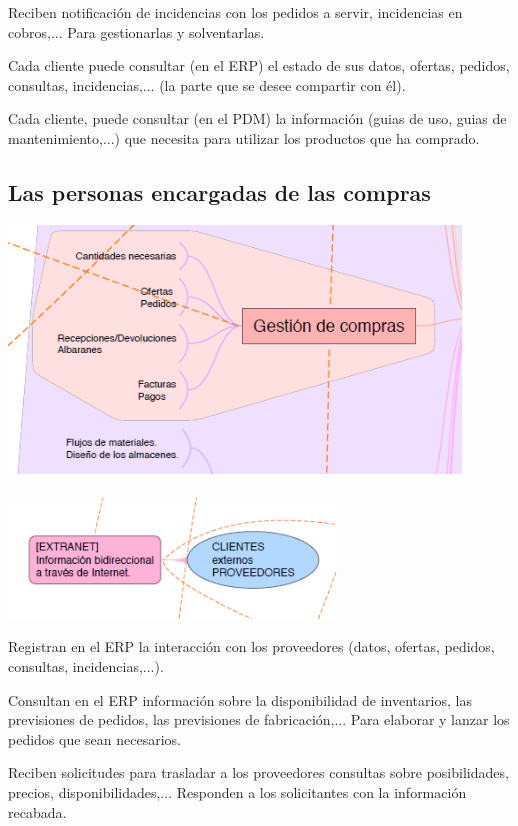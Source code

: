 \documentclass[spanish,12pt,a4paper,final,oneside]{book}
\begin{document}
Reciben notificación de incidencias con los pedidos a servir, incidencias en cobros,... Para gestionarlas y solventarlas.

Cada cliente puede consultar (en el ERP) el estado de sus datos, ofertas, pedidos, consultas, incidencias,... (la parte que se desee compartir con él).

Cada cliente, puede consultar (en el PDM) la información (guias de uso, guias de mantenimiento,...) que necesita para utilizar los productos que ha comprado.

\subsection{Las personas encargadas de las compras}
\includegraphics[width=0.9\textwidth]{subesquema - compras01}
\\\\ \includegraphics[width=0.65\textwidth]{subesquema - compras02}

Registran en el ERP la interacción con los proveedores (datos, ofertas, pedidos, consultas, incidencias,...). 

Consultan en el ERP información sobre la disponibilidad de inventarios, las previsiones de pedidos, las previsiones de fabricación,... Para elaborar y lanzar los pedidos que sean necesarios.

Reciben solicitudes para trasladar a los proveedores consultas sobre posibilidades, precios, disponibilidades,... Responden a los solicitantes con la información recabada.
\end{document}
